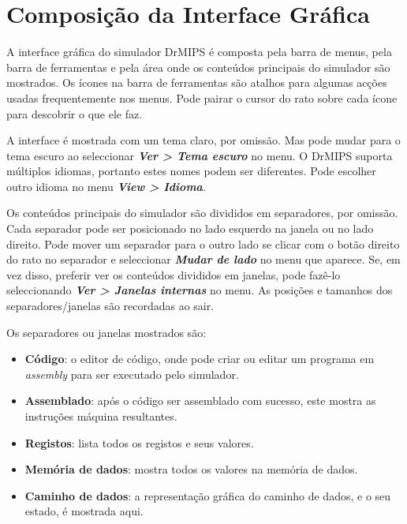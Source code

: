 \documentclass[11pt,a4paper,twoside,titlepage]{article}
\author{Bruno Nova}
\title{\Title}
\newcommand{\menupath}[1]{\textbf{\emph{#1}}}
\begin{document}
\maketitle
\tableofcontents
\newpage

\section{Composição da Interface Gráfica}

A interface gráfica do simulador DrMIPS é composta pela barra de menus, pela
barra de ferramentas e pela área onde os conteúdos principais do simulador são
mostrados.
Os ícones na barra de ferramentas são atalhos para algumas acções usadas
frequentemente nos menus. Pode pairar o cursor do rato sobre cada ícone para
descobrir o que ele faz.

A interface é mostrada com um tema claro, por omissão. Mas pode mudar para o
tema escuro ao seleccionar \menupath{Ver > Tema escuro} no menu.
O DrMIPS suporta múltiplos idiomas, portanto estes nomes podem ser diferentes.
Pode escolher outro idioma no menu \menupath{View > Idioma}.

Os conteúdos principais do simulador são divididos em separadores, por omissão.
Cada separador pode ser posicionado no lado esquerdo na janela ou no lado 
direito.
Pode mover um separador para o outro lado se clicar com o botão direito do rato
no separador e seleccionar \menupath{Mudar de lado} no menu que aparece.
Se, em vez disso, preferir ver os conteúdos divididos em janelas, pode fazê-lo
seleccionando \menupath{Ver > Janelas internas} no menu.
As posições e tamanhos dos separadores/janelas são recordadas ao sair.

Os separadores ou janelas mostrados são:
\begin{itemize}
	\item \textbf{Código}: o editor de código, onde pode criar ou editar um
		programa em \emph{assembly} para ser executado pelo simulador.
	\item \textbf{Assemblado}: após o código ser assemblado com sucesso, 
		este mostra as instruções máquina resultantes.
	\item \textbf{Registos}: lista todos os registos e seus valores.
	\item \textbf{Memória de dados}: mostra todos os valores na memória de 
		dados.
	\item \textbf{Caminho de dados}: a representação gráfica do caminho de
		dados, e o seu estado, é mostrada aqui.
\end{itemize}
\end{document}
